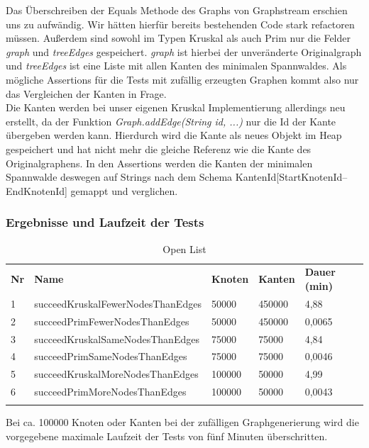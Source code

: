 \documentclass[a4paper]{article}
\begin{document}
Das Überschreiben der Equals Methode des Graphs von Graphstream erschien uns zu aufwändig. Wir hätten hierfür bereits bestehenden Code stark refactoren müssen. Außerdem sind sowohl im Typen Kruskal als auch Prim nur die Felder \textit{graph} und \textit{treeEdges} gespeichert. \textit{graph} ist hierbei der unveränderte Originalgraph und \textit{treeEdges} ist eine Liste mit allen Kanten des minimalen Spannwaldes. Als mögliche Assertions für die Tests mit zufällig erzeugten Graphen kommt also nur das Vergleichen der Kanten in Frage.\\
Die Kanten werden bei unser eigenen Kruskal Implementierung allerdings neu erstellt, da der Funktion \textit{Graph.addEdge(String id, ...)} nur die Id der Kante übergeben werden kann. Hierdurch wird die Kante als neues Objekt im Heap gespeichert und hat nicht mehr die gleiche Referenz wie die Kante des Originalgraphens. In den Assertions werden die Kanten der minimalen Spannwalde deswegen auf Strings nach dem Schema KantenId[StartKnotenId--EndKnotenId] gemappt und verglichen.

\subsubsection{Ergebnisse und Laufzeit der Tests}

\begin{table}[htbp]
    \centering
    \begin{tabular}{||l|l|l|l|l||}
    \hhline{|t:=====:t|}
    \textbf{Nr} & \textbf{Name} & \textbf{Knoten} & \textbf{Kanten} & \textbf{Dauer (min)} \\ \hhline{|-----|}
         1 & succeedKruskalFewerNodesThanEdges & 50000 & 450000 & 4,88 \\ \hhline{|-----|}
         2 & succeedPrimFewerNodesThanEdges & 50000 & 450000 & 0,0065 \\ \hhline{|-----|}
         3 & succeedKruskalSameNodesThanEdges & 75000 & 75000 & 4,84 \\ \hhline{|-----|}
         4 & succeedPrimSameNodesThanEdges & 75000 & 75000 & 0,0046 \\ \hhline{|-----|}
         5 & succeedKruskalMoreNodesThanEdges & 100000 & 50000 & 4,99 \\ \hhline{|-----|}
         6 & succeedPrimMoreNodesThanEdges & 100000 & 50000 & 0,0043 \\ \hhline{|b:=====:b|}
    \end{tabular}
    \caption{Open List}
\end{table}

Bei ca. 100000 Knoten oder Kanten bei der zufälligen Graphgenerierung wird die vorgegebene maximale Laufzeit der Tests von fünf Minuten überschritten. 




\end{document}
